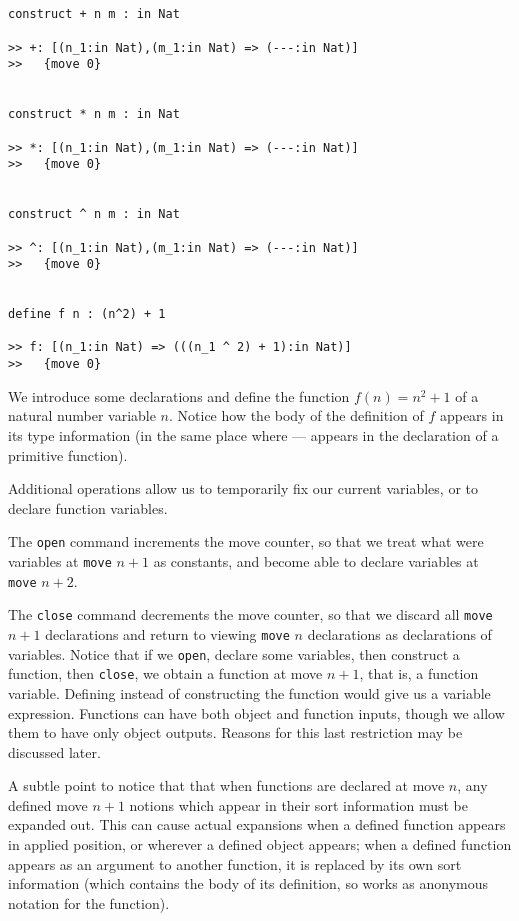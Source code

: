 \documentclass[12pt]{article}
\begin{document}
\begin{verbatim}


construct + n m : in Nat

>> +: [(n_1:in Nat),(m_1:in Nat) => (---:in Nat)]
>>   {move 0}


construct * n m : in Nat

>> *: [(n_1:in Nat),(m_1:in Nat) => (---:in Nat)]
>>   {move 0}


construct ^ n m : in Nat

>> ^: [(n_1:in Nat),(m_1:in Nat) => (---:in Nat)]
>>   {move 0}


define f n : (n^2) + 1

>> f: [(n_1:in Nat) => (((n_1 ^ 2) + 1):in Nat)]
>>   {move 0}

\end{verbatim}

We introduce some declarations and define the function $f(n) = n^2+1$ of a natural number variable $n$.  Notice how the body of the definition of $f$ appears in its type information (in the same place where --- appears in the declaration of a primitive function).

Additional operations allow us to temporarily fix our current variables, or to declare function variables.

The {\tt open} command increments the move counter, so that we treat what were variables at {\tt move} $n+1$ as constants, and become able to declare variables at {\tt move} $n+2$.

The {\tt close} command decrements the move counter, so that we discard all {\tt move} $n+1$ declarations and return to viewing {\tt move} $n$ declarations as declarations of variables.  Notice that if we {\tt open}, declare some variables, then construct a function, then {\tt close}, we obtain a function
at move $n+1$, that is, a function variable.  Defining instead of constructing the function would give us a variable expression.  Functions can have both object and function inputs, though we allow them to have only object outputs.  Reasons for this last restriction may be discussed later.

A subtle point to notice that that when functions are declared at move $n$, any defined move $n+1$ notions which appear in their sort information must be expanded out.  This can cause actual expansions when a defined function appears in applied position,  or wherever a defined object appears; when a defined function appears as an argument to another function, it is replaced by its own sort information (which contains the body of its definition, so works as anonymous notation for the function).
\end{document}
